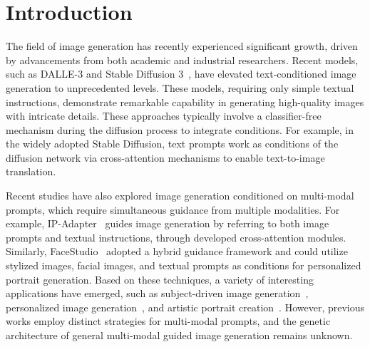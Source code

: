 \section{Introduction}\label{sec:intro}




The field of image generation has recently experienced significant growth, driven by advancements from both academic and industrial researchers. Recent models, such as DALLE-3 and Stable Diffusion 3~\cite{sd3}, have elevated text-conditioned image generation to unprecedented levels. These models, requiring only simple textual instructions, demonstrate remarkable capability in generating high-quality images with intricate details. 
These approaches typically involve a classifier-free mechanism during the diffusion process to integrate conditions. For example, in the widely adopted Stable Diffusion, text prompts work as conditions of the diffusion network via cross-attention mechanisms to enable text-to-image translation.

Recent studies have also explored image generation conditioned on multi-modal prompts, which require simultaneous guidance from multiple modalities. For example, IP-Adapter~\cite{ye2023ip} guides image generation by referring to both image prompts and textual instructions, through developed cross-attention modules. Similarly, FaceStudio~\cite{yan2023facestudio} adopted a hybrid guidance framework and could utilize stylized images, facial images, and textual prompts as conditions for personalized portrait generation.
Based on these techniques, a variety of interesting applications have emerged, such as subject-driven image generation~\cite{pan2023kosmos, li2024blip, purushwalkam2024bootpig}, personalized image generation~\cite{wang2024instantid, yan2023facestudio}, and artistic portrait creation~\cite{ye2023ip}.
However, previous works employ distinct strategies for multi-modal prompts, and the genetic architecture of general multi-modal guided image generation remains unknown.

